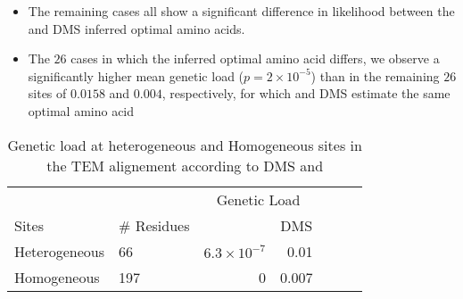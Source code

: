 \documentclass[12pt]{article}
\begin{document}
\begin{itemize}
\begin{itemize}
\begin{itemize}
\begin{itemize}
			\item The remaining cases all show a significant difference in likelihood between the \selac and DMS inferred optimal amino acids.
			\item The $26$ cases in which the inferred optimal amino acid differs, we observe a significantly higher mean genetic load ($p = 2\times10^{-5}$) than in the remaining $26$ sites of $0.0158$ and $0.004$, respectively, for which \selac and DMS estimate the same optimal amino acid
		\end{itemize}
	\end{itemize}
\end{itemize}


\begin{table}[h]
  \centering
  \caption{Genetic load at heterogeneous and Homogeneous sites in the TEM alignement according to DMS and \selac}
  \begin{tabular}{llrrrrr}
    \hline
			& 		& \multicolumn{2}{c}{Genetic Load}  \\ 
    Sites 		& \# Residues	& \multicolumn{1}{c}{\selac} & \multicolumn{1}{c}{DMS} \\ \hline 
    Heterogeneous	&	66	& $6.3\times10^{-7}$ & 0.01  \\
    Homogeneous		& 	197	& 0 & 0.007 \\
  \end{tabular}
  \label{tab:selection}
\end{table}


\end{itemize}
\end{document}
